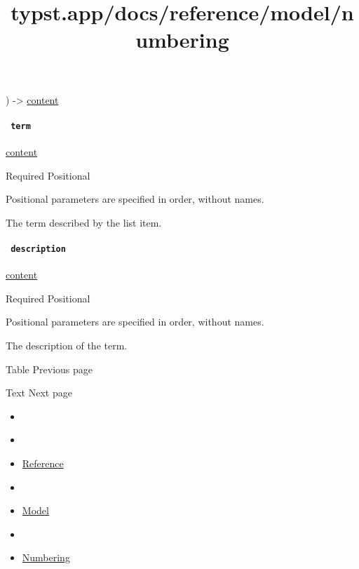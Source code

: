 ) -\textgreater{} \href{/docs/reference/foundations/content/}{content}

\paragraph{\texorpdfstring{\texttt{\ term\ }}{ term }}\label{definitions-item-term}

\href{/docs/reference/foundations/content/}{content}

{Required} {{ Positional }}

\label{definitions-item-term-positional-tooltip}
Positional parameters are specified in order, without names.

The term described by the list item.

\paragraph{\texorpdfstring{\texttt{\ description\ }}{ description }}\label{definitions-item-description}

\href{/docs/reference/foundations/content/}{content}

{Required} {{ Positional }}

\label{definitions-item-description-positional-tooltip}
Positional parameters are specified in order, without names.

The description of the term.

\href{/docs/reference/model/table/}{\pandocbounded{}}

{ Table } { Previous page }

\href{/docs/reference/text/}{\pandocbounded{}}

{ Text } { Next page }


\title{typst.app/docs/reference/model/numbering}

\begin{itemize}
\tightlist
\item
  \href{/docs}{}
\item
  
\item
  \href{/docs/reference/}{Reference}
\item
  
\item
  \href{/docs/reference/model/}{Model}
\item
  
\item
  \href{/docs/reference/model/numbering/}{Numbering}
\end{itemize}

